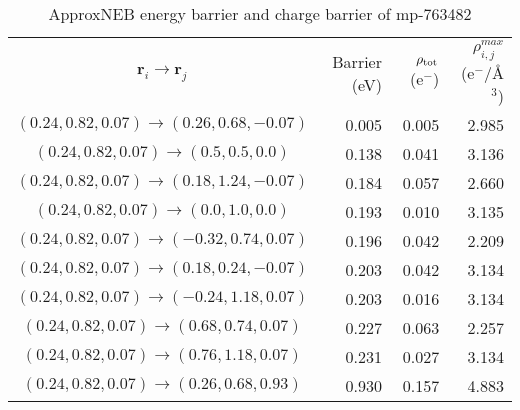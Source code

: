 \documentclass[reprint,preprintnumbers,amsmath,amssymb,aps,prl]{revtex4-1}
\begin{document}
\begin{table}[h]
    \centering
    \caption{ApproxNEB energy barrier and charge barrier of mp-763482}
    \begin{ruledtabular}
        \begin{tabular}{crrr}
            $\bm{r}_i \rightarrow \bm{r}_j$                     & Barrier (eV) & $\rho_{\rm tot}$ (e$^{-}$) & $\rho^{max}_{i,j}$ (e$^{-}$/\AA{}$^3$)\\
            \colrule
            $(0.24, 0.82, 0.07)\rightarrow(0.26, 0.68, -0.07) $ & 0.005        & 0.005                      & 2.985          \\
            $(0.24, 0.82, 0.07)\rightarrow(0.5, 0.5, 0.0) $     & 0.138        & 0.041                      & 3.136          \\
            $(0.24, 0.82, 0.07)\rightarrow(0.18, 1.24, -0.07) $ & 0.184        & 0.057                      & 2.660          \\
            $(0.24, 0.82, 0.07)\rightarrow(0.0, 1.0, 0.0) $     & 0.193        & 0.010                      & 3.135          \\
            $(0.24, 0.82, 0.07)\rightarrow(-0.32, 0.74, 0.07) $ & 0.196        & 0.042                      & 2.209          \\
            $(0.24, 0.82, 0.07)\rightarrow(0.18, 0.24, -0.07) $ & 0.203        & 0.042                      & 3.134          \\
            $(0.24, 0.82, 0.07)\rightarrow(-0.24, 1.18, 0.07) $ & 0.203        & 0.016                      & 3.134          \\
            $(0.24, 0.82, 0.07)\rightarrow(0.68, 0.74, 0.07) $  & 0.227        & 0.063                      & 2.257          \\
            $(0.24, 0.82, 0.07)\rightarrow(0.76, 1.18, 0.07) $  & 0.231        & 0.027                      & 3.134          \\
            $(0.24, 0.82, 0.07)\rightarrow(0.26, 0.68, 0.93) $  & 0.930        & 0.157                      & 4.883          \\
        \end{tabular}
    \end{ruledtabular}
\end{table}

\newpage
\end{document}
